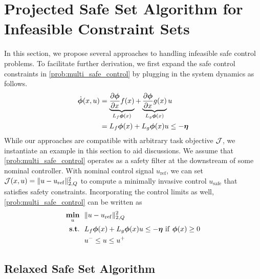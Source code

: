\section{Projected Safe Set Algorithm for Infeasible Constraint Sets}
\label{sec:method}

In this section, we propose several approaches to handling infeasible safe control problems.
To facilitate further derivation, we first expand the safe control constraints in \eqref{prob:multi_safe_control} by plugging in the system dynamics as follows.
\begin{align}\label{eq:expand_safe_constraint}
\dot{\bm{\phi}}(x,u) &= \underbrace{\frac{\partial\bm{\phi}}{\partial x}f(x)}_{L_f\bm{\phi}(x)} + \underbrace{\frac{\partial\bm{\phi}}{\partial x}g(x)}_{L_g\bm{\phi}(x)} u \\\nonumber
&= L_f\bm{\phi}(x) + L_g\bm{\phi}(x) u \leq -\bm{\eta}
\end{align}
While our approaches are compatible with arbitrary task objective $\mathcal{J}$, we instantiate an example in this section to aid discussions.
We assume that \eqref{prob:multi_safe_control} operates as a safety filter at the downstream of some nominal controller.
With nominal control signal $u_\mathrm{ref}$, we can set $\mathcal{J}(x,u) = \|u-u_\mathrm{ref}\|_{2,Q}^2$ to compute a minimally invasive control $u_\mathrm{safe}$ that satisfies safety constraints.
Incorporating the control limits as well, \eqref{prob:multi_safe_control} can be written as
\begin{subequations}\label{prob:naive_ssa}
\begin{align}
\mathop{\underset{{u}}{\mathop{\mathbf{min}}}}~~ & \|u-u_\mathrm{ref}\|_{2,Q}^2   \\
\mathop{\mathbf{s.t.}}~~ & L_f\bm{\phi}(x) + L_g\bm{\phi}(x) u \leq -\bm{\eta}~\mathrm{if}~\bm{\phi}(x) \geq 0  \label{eq:infeas_ssa_contr_lie} \\ 
& u^- \leq u \leq u^+ \label{eq:control_limit}
\end{align}
\end{subequations}

\subsection{Relaxed Safe Set Algorithm}\label{sec:rssa}

